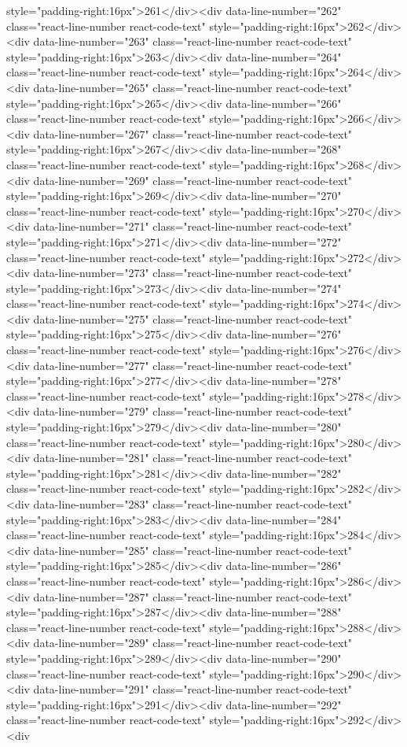 {{{{{{{style="padding-right:16px">261</div><div data-line-number="262" class="react-line-number react-code-text" style="padding-right:16px">262</div><div data-line-number="263" class="react-line-number react-code-text" style="padding-right:16px">263</div><div data-line-number="264" class="react-line-number react-code-text" style="padding-right:16px">264</div><div data-line-number="265" class="react-line-number react-code-text" style="padding-right:16px">265</div><div data-line-number="266" class="react-line-number react-code-text" style="padding-right:16px">266</div><div data-line-number="267" class="react-line-number react-code-text" style="padding-right:16px">267</div><div data-line-number="268" class="react-line-number react-code-text" style="padding-right:16px">268</div><div data-line-number="269" class="react-line-number react-code-text" style="padding-right:16px">269</div><div data-line-number="270" class="react-line-number react-code-text" style="padding-right:16px">270</div><div data-line-number="271" class="react-line-number react-code-text" style="padding-right:16px">271</div><div data-line-number="272" class="react-line-number react-code-text" style="padding-right:16px">272</div><div data-line-number="273" class="react-line-number react-code-text" style="padding-right:16px">273</div><div data-line-number="274" class="react-line-number react-code-text" style="padding-right:16px">274</div><div data-line-number="275" class="react-line-number react-code-text" style="padding-right:16px">275</div><div data-line-number="276" class="react-line-number react-code-text" style="padding-right:16px">276</div><div data-line-number="277" class="react-line-number react-code-text" style="padding-right:16px">277</div><div data-line-number="278" class="react-line-number react-code-text" style="padding-right:16px">278</div><div data-line-number="279" class="react-line-number react-code-text" style="padding-right:16px">279</div><div data-line-number="280" class="react-line-number react-code-text" style="padding-right:16px">280</div><div data-line-number="281" class="react-line-number react-code-text" style="padding-right:16px">281</div><div data-line-number="282" class="react-line-number react-code-text" style="padding-right:16px">282</div><div data-line-number="283" class="react-line-number react-code-text" style="padding-right:16px">283</div><div data-line-number="284" class="react-line-number react-code-text" style="padding-right:16px">284</div><div data-line-number="285" class="react-line-number react-code-text" style="padding-right:16px">285</div><div data-line-number="286" class="react-line-number react-code-text" style="padding-right:16px">286</div><div data-line-number="287" class="react-line-number react-code-text" style="padding-right:16px">287</div><div data-line-number="288" class="react-line-number react-code-text" style="padding-right:16px">288</div><div data-line-number="289" class="react-line-number react-code-text" style="padding-right:16px">289</div><div data-line-number="290" class="react-line-number react-code-text" style="padding-right:16px">290</div><div data-line-number="291" class="react-line-number react-code-text" style="padding-right:16px">291</div><div data-line-number="292" class="react-line-number react-code-text" style="padding-right:16px">292</div><div }}}}}}}

